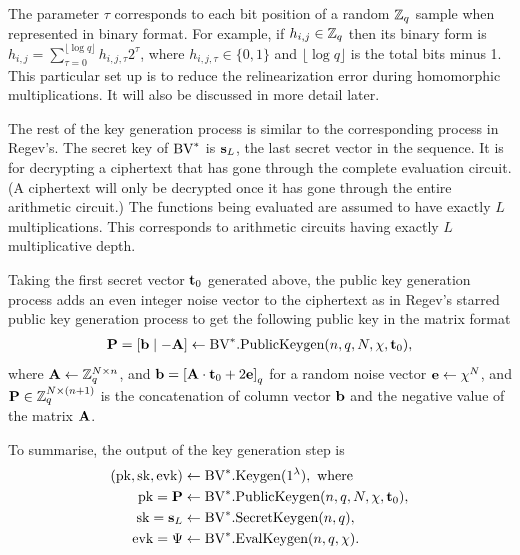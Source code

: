 \documentclass[../main.tex]{subfiles}
\begin{document}
The parameter $\tau$ corresponds to each bit position of a random $\mathbb{Z}_q$ sample when represented in binary format. For example, if $h_{i,j} \in \mathbb{Z}_q$ then its binary form is $h_{i,j}=\sum_{\tau=0}^{\lfloor \log q \rfloor} h_{i,j,\tau} 2^{\tau}$, where $h_{i,j,\tau} \in \{0,1\}$ and $\lfloor \log q \rfloor$ is the total bits minus 1. This particular set up is to reduce the relinearization error during homomorphic multiplications. It will also be discussed in more detail later. 

The rest of the key generation process is similar to the corresponding process in Regev's. The secret key of $\text{BV}^*$ is $\mathbf{s}_L$, the last secret vector in the sequence. 
It is for decrypting a ciphertext that has gone through the complete evaluation circuit.
(A ciphertext will only be decrypted once it has gone through the entire arithmetic circuit.) 
The functions being evaluated are assumed to have exactly $L$ multiplications. This corresponds to arithmetic circuits having exactly $L$ multiplicative depth.
 
Taking the first secret vector $\mathbf{t}_0$ generated above, the public key generation process adds an even integer noise vector to the ciphertext as in Regev's starred public key generation process to get the following public key in the matrix format
\begin{align*}
    \vc{P} =[\vc{b} \mid -\vc{A}] \leftarrow \bvv.\pubkeygen(n,q,N,\chi,\vc{t}_0), %
\end{align*}
where $\mathbf{A} \leftarrow \mathbb{Z}_q^{N \times n}$, 
and $\mathbf{b} = \left[{\mathbf{A} \cdot \mathbf{t}_0 + 2\mathbf{e}}\right]_q$ for a random noise vector $\mathbf{e} \leftarrow \chi^N$, and $\mathbf{P} \in \mathbb{Z}_q^{N \times (n+1)}$ is the concatenation of column vector $\mathbf{b}$ and the negative value of the matrix $\mathbf{A}$.


To summarise, the output of the key generation step is
\begin{align*}
    (\text{pk}, \text{sk}, \text{evk}) &\leftarrow \text{BV}^*.\text{Keygen}(1^{\lambda}), \text{ where }\\
    \text{pk} = \mathbf{P} &\leftarrow \text{BV}^*.\text{PublicKeygen}(n,q,N,\chi,\mathbf{t}_0), \\
    \text{sk}=\mathbf{s}_L &\leftarrow \text{BV}^*.\text{SecretKeygen}(n,q), \\
    \text{evk}=\Psi &\leftarrow \text{BV}^*.\text{EvalKeygen}(n,q,\chi).
\end{align*}
\end{document}
